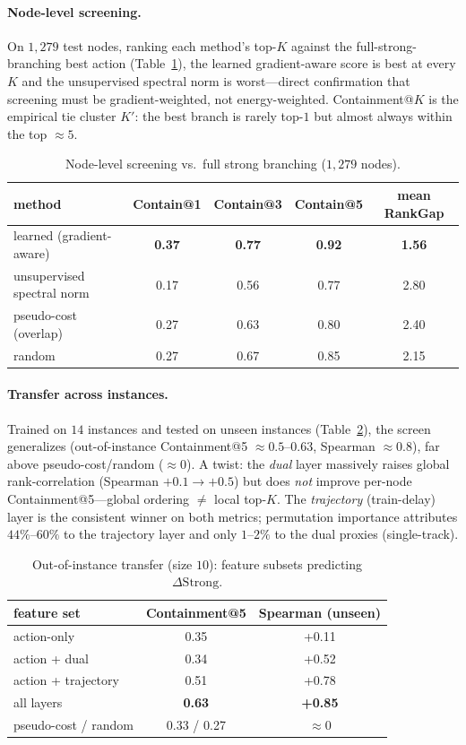 \documentclass[11pt]{article}
\begin{document}
\paragraph{Node-level screening.} On $1{,}279$ test nodes, ranking each method's top-$K$ against
the full-strong-branching best action (Table~\ref{tab:contain}), the learned gradient-aware
score is best at every $K$ and the unsupervised spectral norm is worst---direct confirmation
that screening must be gradient-weighted, not energy-weighted. Containment@$K$ is the empirical
tie cluster $K'$: the best branch is rarely top-$1$ but almost always within the top $\approx 5$.

\begin{table}[t]\centering
\caption{Node-level screening vs.\ full strong branching ($1{,}279$ nodes).}\label{tab:contain}
\begin{tabular}{lcccc}
\toprule
method & Contain@1 & Contain@3 & Contain@5 & mean RankGap \\
\midrule
learned (gradient-aware) & \bf 0.37 & \bf 0.77 & \bf 0.92 & \bf 1.56 \\
unsupervised spectral norm & 0.17 & 0.56 & 0.77 & 2.80 \\
pseudo-cost (overlap) & 0.27 & 0.63 & 0.80 & 2.40 \\
random & 0.27 & 0.67 & 0.85 & 2.15 \\
\bottomrule
\end{tabular}
\end{table}

\paragraph{Transfer across instances.} Trained on $14$ instances and tested on unseen
instances (Table~\ref{tab:transfer}), the screen generalizes (out-of-instance Containment@5
$\approx 0.5$--$0.63$, Spearman $\approx 0.8$), far above pseudo-cost/random ($\approx 0$). A
twist: the \emph{dual} layer massively raises global rank-correlation (Spearman $+0.1\to+0.5$)
but does \emph{not} improve per-node Containment@5---global ordering $\neq$ local top-$K$. The
\emph{trajectory} (train-delay) layer is the consistent winner on both metrics; permutation
importance attributes $44\%$--$60\%$ to the trajectory layer and only $1$--$2\%$ to the dual
proxies (single-track).

\begin{table}[t]\centering
\caption{Out-of-instance transfer (size $10$): feature subsets predicting $\Delta\mathrm{Strong}$.}
\label{tab:transfer}
\begin{tabular}{lcc}
\toprule
feature set & Containment@5 & Spearman (unseen) \\
\midrule
action-only & 0.35 & +0.11 \\
action + dual & 0.34 & +0.52 \\
action + trajectory & 0.51 & +0.78 \\
all layers & \bf 0.63 & \bf +0.85 \\
pseudo-cost / random & 0.33 / 0.27 & $\approx 0$ \\
\bottomrule
\end{tabular}
\end{table}
\end{document}
